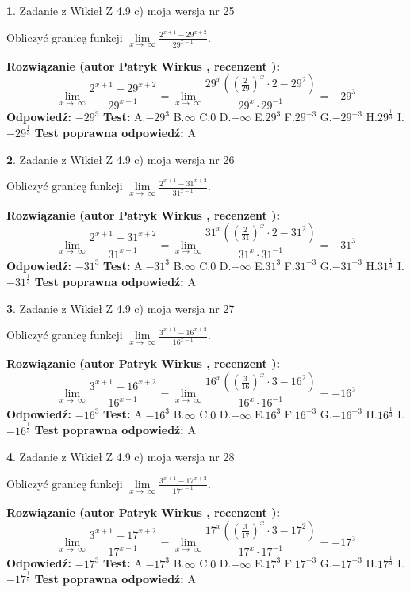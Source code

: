 \documentclass[12pt, a4paper]{article}
\theoremstyle{definition} %
\newtheorem{zad}{}
\newcommand{\zadStart}[1]{\begin{zad}#1\newline}
\newcommand{\zadStop}{\end{zad}}
\newcommand{\rozwStart}[2]{\noindent \textbf{Rozwiązanie (autor #1 , recenzent #2): }\newline}
\newcommand{\rozwStop}{\newline}
\newcommand{\odpStart}{\noindent \textbf{Odpowiedź:}\newline}
\newcommand{\odpStop}{\newline}
\newcommand{\testStart}{\noindent \textbf{Test:}\newline}
\newcommand{\testStop}{\newline}
\newcommand{\kluczStart}{\noindent \textbf{Test poprawna odpowiedź:}\newline}
\newcommand{\kluczStop}{\newline}
\begin{document}
\zadStart{Zadanie z Wikieł Z 4.9 c) moja wersja nr 25}


Obliczyć granicę funkcji  $\lim\limits_{x\to\ \infty}\frac{2^{x+1}-29^{x+2}}{29^{x-1}}$.
\zadStop
\rozwStart{Patryk Wirkus}{}
$$\lim\limits_{x\to\ \infty}\frac{2^{x+1}-29^{x+2}}{29^{x-1}}=\lim\limits_{x\to\ \infty}\frac{29^{x}((\frac{2}{29})^{x}\cdot 2 -29^{2})}{29^{x}\cdot 29^{-1}} = -29^{3}$$
\rozwStop
\odpStart
$-29^{3}$
\odpStop
\testStart
A.$-29^{3}$ B.$\infty$ C.$0$ D.$-\infty$ E.$29^{3}$
F.$29^{-3}$ G.$-29^{-3}$
H.$29^{\frac{1}{3}}$
I.$-29^{\frac{1}{3}}$
\testStop
\kluczStart
A
\kluczStop



\zadStart{Zadanie z Wikieł Z 4.9 c) moja wersja nr 26}


Obliczyć granicę funkcji  $\lim\limits_{x\to\ \infty}\frac{2^{x+1}-31^{x+2}}{31^{x-1}}$.
\zadStop
\rozwStart{Patryk Wirkus}{}
$$\lim\limits_{x\to\ \infty}\frac{2^{x+1}-31^{x+2}}{31^{x-1}}=\lim\limits_{x\to\ \infty}\frac{31^{x}((\frac{2}{31})^{x}\cdot 2 -31^{2})}{31^{x}\cdot 31^{-1}} = -31^{3}$$
\rozwStop
\odpStart
$-31^{3}$
\odpStop
\testStart
A.$-31^{3}$ B.$\infty$ C.$0$ D.$-\infty$ E.$31^{3}$
F.$31^{-3}$ G.$-31^{-3}$
H.$31^{\frac{1}{3}}$
I.$-31^{\frac{1}{3}}$
\testStop
\kluczStart
A
\kluczStop



\zadStart{Zadanie z Wikieł Z 4.9 c) moja wersja nr 27}


Obliczyć granicę funkcji  $\lim\limits_{x\to\ \infty}\frac{3^{x+1}-16^{x+2}}{16^{x-1}}$.
\zadStop
\rozwStart{Patryk Wirkus}{}
$$\lim\limits_{x\to\ \infty}\frac{3^{x+1}-16^{x+2}}{16^{x-1}}=\lim\limits_{x\to\ \infty}\frac{16^{x}((\frac{3}{16})^{x}\cdot 3 -16^{2})}{16^{x}\cdot 16^{-1}} = -16^{3}$$
\rozwStop
\odpStart
$-16^{3}$
\odpStop
\testStart
A.$-16^{3}$ B.$\infty$ C.$0$ D.$-\infty$ E.$16^{3}$
F.$16^{-3}$ G.$-16^{-3}$
H.$16^{\frac{1}{3}}$
I.$-16^{\frac{1}{3}}$
\testStop
\kluczStart
A
\kluczStop



\zadStart{Zadanie z Wikieł Z 4.9 c) moja wersja nr 28}


Obliczyć granicę funkcji  $\lim\limits_{x\to\ \infty}\frac{3^{x+1}-17^{x+2}}{17^{x-1}}$.
\zadStop
\rozwStart{Patryk Wirkus}{}
$$\lim\limits_{x\to\ \infty}\frac{3^{x+1}-17^{x+2}}{17^{x-1}}=\lim\limits_{x\to\ \infty}\frac{17^{x}((\frac{3}{17})^{x}\cdot 3 -17^{2})}{17^{x}\cdot 17^{-1}} = -17^{3}$$
\rozwStop
\odpStart
$-17^{3}$
\odpStop
\testStart
A.$-17^{3}$ B.$\infty$ C.$0$ D.$-\infty$ E.$17^{3}$
F.$17^{-3}$ G.$-17^{-3}$
H.$17^{\frac{1}{3}}$
I.$-17^{\frac{1}{3}}$
\testStop
\kluczStart
A
\kluczStop
\end{document}
